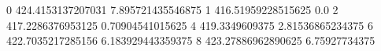 0 424.4153137207031 7.895721435546875
1 416.51959228515625 0.0
2 417.2286376953125 0.70904541015625
4 419.3349609375 2.81536865234375
6 422.7035217285156 6.183929443359375
8 423.27886962890625 6.75927734375
